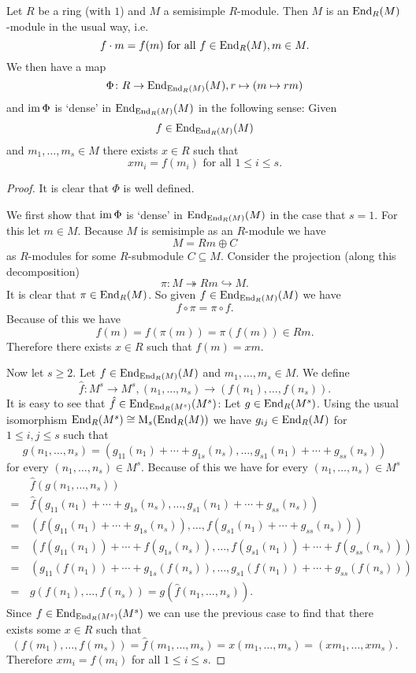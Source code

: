 \begin{thrm}
  Let $R$ be a ring (with $1$) and $M$ a semisimple $R$-module. Then $M$ is an $\operatorname{End}_R(M)$-module in the usual way, i.e.\
  \[
    f \cdot m = f(m) \text{ for all } f \in \operatorname{End}_R(M), m \in M.
  \]
  We then have a map
  \[
    \Phi \colon R \to \operatorname{End}_{\operatorname{End}_R(M)}(M), r \mapsto (m \mapsto rm)
  \]
  and $\operatorname{im} \Phi$ is `dense' in $\operatorname{End}_{\operatorname{End}_R(M)}(M)$ in the following sense: Given
  \[
    f \in \operatorname{End}_{\operatorname{End}_R(M)}(M)
  \]
  and $m_1, \dotsc, m_s \in M$ there exists $x \in R$ such that
  \[
    x m_i = f(m_i) \text{ for all } 1 \leq i \leq s.
  \]
\end{thrm}
\begin{proof}
  It is clear that $\Phi$ is well defined.
  
  We first show that $\operatorname{im} \Phi$ is `dense' in $\operatorname{End}_{\operatorname{End}_R(M)}(M)$ in the case that $s = 1$. For this let $m \in M$. Because $M$ is semisimple as an $R$-module we have
  \[
    M = Rm \oplus C
  \]
  as $R$-modules for some $R$-submodule $C \subseteq M$. Consider the projection (along this decomposition)
  \[
    \pi \colon M \twoheadrightarrow Rm \hookrightarrow M.
  \]
  It is clear that $\pi \in \operatorname{End}_R(M)$. So given $f \in \operatorname{End}_{\operatorname{End}_R(M)}(M)$ we have
  \[
    f \circ \pi = \pi \circ f.
  \]
  Because of this we have
  \[
    f(m) = f(\pi(m)) = \pi(f(m)) \in Rm.
  \]
  Therefore there exists $x \in R$ such that $f(m) = xm$.

  Now let $s \geq 2$. Let $f \in \operatorname{End}_{\operatorname{End}_R(M)}(M)$ and $m_1, \dotsc, m_s \in M$. We define
  \[
    \hat{f} \colon M^s \to M^s, (n_1, \dotsc, n_s) \to (f(n_1), \dotsc, f(n_s)).
  \]
  It is easy to see that $\hat{f} \in \operatorname{End}_{\operatorname{End}_R(M^s)}(M^s)$: Let $g \in \operatorname{End}_R(M^s)$. Using the usual isomorphism $\operatorname{End}_R(M^s) \cong \operatorname{M}_s(\operatorname{End}_R(M))$ we have $g_{ij} \in \operatorname{End}_R(M)$ for $1 \leq i,j \leq s$ such that
  \[
    g(n_1, \dotsc, n_s) = (g_{11}(n_1) + \dotsb + g_{1s}(n_s), \dotsc, g_{s1}(n_1) + \dotsb + g_{ss}(n_s))
  \]
  for every $(n_1, \dotsc, n_s) \in M^s$. Because of this we have for every $(n_1, \dotsc, n_s) \in M^s$
  \begin{align*}
      &\, \hat{f}(g(n_1, \dotsc, n_s)) \\
    =&\, \hat{f}(g_{11}(n_1) + \dotsb + g_{1s}(n_s), \dotsc, g_{s1}(n_1) + \dotsb + g_{ss}(n_s)) \\
    =&\, (f(g_{11}(n_1) + \dotsb + g_{1s}(n_s)), \dotsc, f(g_{s1}(n_1) + \dotsb + g_{ss}(n_s))) \\
    =&\, (f(g_{11}(n_1)) + \dotsb + f(g_{1s}(n_s)), \dotsc, f(g_{s1}(n_1)) + \dotsb + f(g_{ss}(n_s))) \\
    =&\, (g_{11}(f(n_1)) + \dotsb + g_{1s}(f(n_s)), \dotsc, g_{s1}(f(n_1)) + \dotsb + g_{ss}(f(n_s))) \\
    =&\, g(f(n_1), \dotsc, f(n_s))
    =    g(\hat{f}(n_1, \dotsc, n_s)).
  \end{align*}
  Since $f \in \operatorname{End}_{\operatorname{End}_R(M^s)}(M^s)$ we can use the previous case to find that there exists some $x \in R$ such that
  \[
    (f(m_1), \dotsc, f(m_s))
    = \hat{f}(m_1, \dotsc, m_s)
    = x (m_1, \dotsc, m_s)
    = (x m_1, \dotsc, x m_s).
  \]
  Therefore $x m_i = f(m_i)$ for all $1 \leq i \leq s$.
\end{proof}


